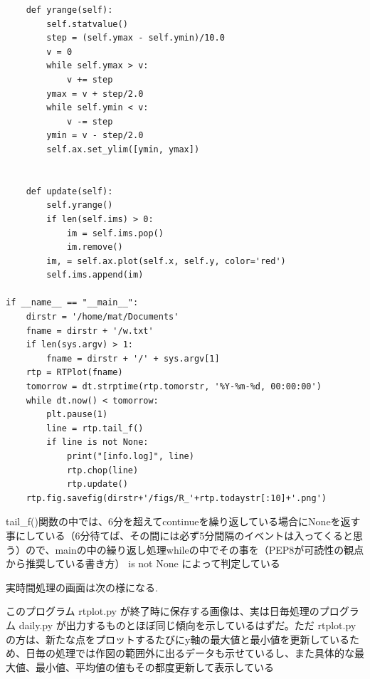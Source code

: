 \documentclass[12pt,a4paper,uplatex]{jsarticle}
\begin{document}
\begin{breakbox}
\begin{verbatim}
    def yrange(self):
        self.statvalue()
        step = (self.ymax - self.ymin)/10.0
        v = 0
        while self.ymax > v:
            v += step
        ymax = v + step/2.0
        while self.ymin < v:
            v -= step
        ymin = v - step/2.0
        self.ax.set_ylim([ymin, ymax])


    def update(self):
        self.yrange()
        if len(self.ims) > 0:
            im = self.ims.pop()
            im.remove()
        im, = self.ax.plot(self.x, self.y, color='red')
        self.ims.append(im)

if __name__ == "__main__":
    dirstr = '/home/mat/Documents'
    fname = dirstr + '/w.txt'
    if len(sys.argv) > 1:
        fname = dirstr + '/' + sys.argv[1]
    rtp = RTPlot(fname)
    tomorrow = dt.strptime(rtp.tomorstr, '%Y-%m-%d, 00:00:00')
    while dt.now() < tomorrow:
        plt.pause(1)
        line = rtp.tail_f()
        if line is not None:
            print("[info.log]", line)
            rtp.chop(line)
            rtp.update()
    rtp.fig.savefig(dirstr+'/figs/R_'+rtp.todaystr[:10]+'.png')
	\end{verbatim}
\end{breakbox}

tail\_f()関数の中では、6分を超えてcontinueを繰り返している場合にNoneを返す事にしている（6分待てば、その間には必ず5分間隔のイベントは入ってくると思う）ので、mainの中の繰り返し処理whileの中でその事を（PEP8が可読性の観点から推奨している書き方） is not None によって判定している

実時間処理の画面は次の様になる.

このプログラム rtplot.py が終了時に保存する画像は、実は日毎処理のプログラム daily.py が出力するものとほぼ同じ傾向を示しているはずだ。ただ rtplot.py の方は、新たな点をプロットするたびにy軸の最大値と最小値を更新しているため、日毎の処理では作図の範囲外に出るデータも示せているし、また具体的な最大値、最小値、平均値の値もその都度更新して表示している
\end{document}
